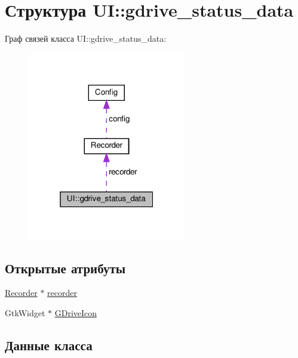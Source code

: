 \hypertarget{struct_u_i_1_1gdrive__status__data}{}\section{Структура UI\+:\+:gdrive\+\_\+status\+\_\+data}
\label{struct_u_i_1_1gdrive__status__data}


Граф связей класса UI\+:\+:gdrive\+\_\+status\+\_\+data\+:\nopagebreak
\begin{figure}[H]
\begin{center}
\leavevmode
\includegraphics[width=196pt]{struct_u_i_1_1gdrive__status__data__coll__graph}
\end{center}
\end{figure}
\subsection*{Открытые атрибуты}
\begin{DoxyCompactItemize}
\item 
\hyperlink{class_recorder}{Recorder} $\ast$ \hyperlink{struct_u_i_1_1gdrive__status__data_a8634b4af863a719fe24b39b88ab103a9}{recorder}
\item 
Gtk\+Widget $\ast$ \hyperlink{struct_u_i_1_1gdrive__status__data_a7c780ddf23f96c083557c889efd85130}{G\+Drive\+Icon}
\end{DoxyCompactItemize}


\subsection{Данные класса}
\mbox{\label{struct_u_i_1_1gdrive__status__data_a7c780ddf23f96c083557c889efd85130}} 
